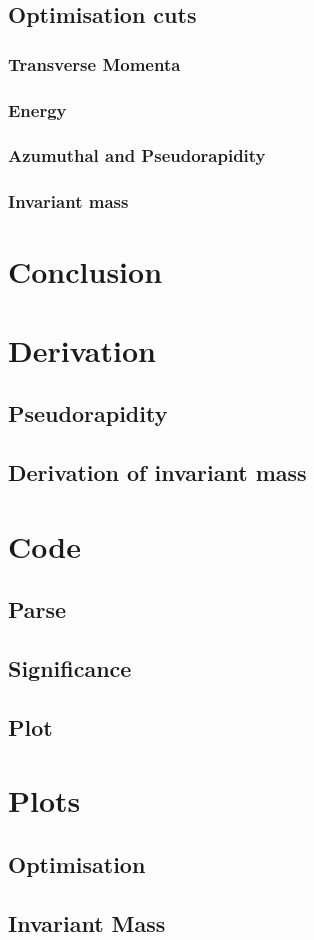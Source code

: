 \documentclass{article}
\begin{document}
\subsection{Optimisation cuts}
\subsubsection{Transverse Momenta}
\subsubsection{Energy}
\subsubsection{Azumuthal and Pseudorapidity}
\subsubsection{Invariant mass}
\section{Conclusion}


\appendix
\section{Derivation}
\subsection{Pseudorapidity}
\subsection{Derivation of invariant mass}
\section{Code}
\subsection{Parse}
\subsection{Significance}
\subsection{Plot}
\section{Plots}
\subsection{Optimisation}
\subsection{Invariant Mass}
\end{document}
